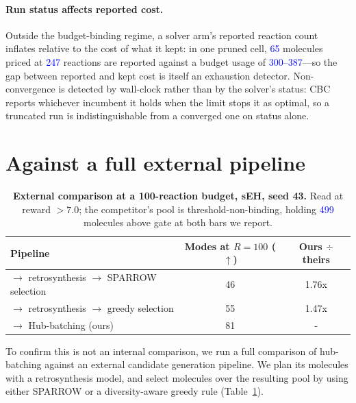 \documentclass{article}
\newcommand{\checkval}[1]{\textcolor{blue}{#1}}
\begin{document}
\paragraph{Run status affects reported cost.}
Outside the budget-binding regime, a solver arm's reported reaction count inflates relative to the cost of what it kept: in one pruned cell, \checkval{65} molecules priced at \checkval{247} reactions are reported against a budget usage of \checkval{300--387}---so the gap between reported and kept cost is itself an exhaustion detector. Non-convergence is detected by wall-clock rather than by the solver's status: CBC reports whichever incumbent it holds when the limit stops it as optimal, so a truncated run is indistinguishable from a converged one on status alone.


\section{Against a full external pipeline}
\label{app:external}
\begin{table}[t]
\centering
\caption{\textbf{External comparison at a 100-reaction budget, sEH, seed 43.} Read at
reward $>7.0$; the competitor's pool is threshold-non-binding, holding \checkval{499}
molecules above gate at both bars we report.}
\label{tab:external}
\small
\begin{tabular}{lcc}
\toprule
Pipeline & Modes at $R=100$ ($\uparrow$) & Ours $\div$ theirs \\
\midrule
\citet{kim2026s3gfn} $\to$ retrosynthesis $\to$ SPARROW selection & 46 & 1.76x \\
\citet{kim2026s3gfn} $\to$ retrosynthesis $\to$ greedy selection & 55 & 1.47x \\
\citet{gainski2026scent} $\to$ Hub-batching (ours) & 81 & - \\
\bottomrule
\end{tabular}
\end{table}

To confirm this is not an internal comparison, we run a full comparison of hub-batching against an external candidate generation pipeline. We plan its molecules with a retrosynthesis model, and select molecules over the resulting pool by using either SPARROW or a diversity-aware greedy rule (Table~\ref{tab:external}).

\end{document}
